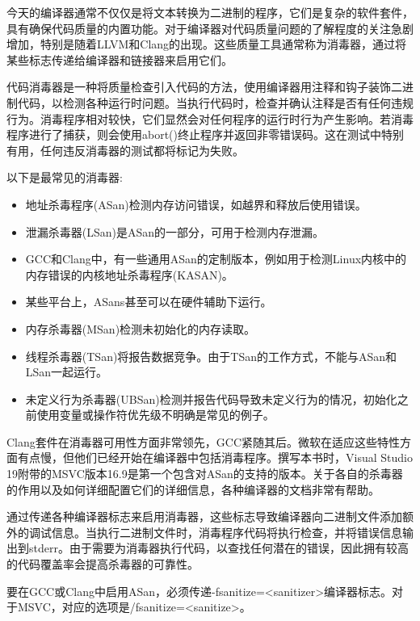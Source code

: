 今天的编译器通常不仅仅是将文本转换为二进制的程序，它们是复杂的软件套件，具有确保代码质量的内置功能。对于编译器对代码质量问题的了解程度的关注急剧增加，特别是随着LLVM和Clang的出现。这些质量工具通常称为消毒器，通过将某些标志传递给编译器和链接器来启用它们。

代码消毒器是一种将质量检查引入代码的方法，使用编译器用注释和钩子装饰二进制代码，以检测各种运行时问题。当执行代码时，检查并确认注释是否有任何违规行为。消毒程序相对较快，它们显然会对任何程序的运行时行为产生影响。若消毒程序进行了捕获，则会使用abort()终止程序并返回非零错误码。这在测试中特别有用，任何违反消毒器的测试都将标记为失败。

以下是最常见的消毒器:

\begin{itemize}
\item 
地址杀毒程序(ASan)检测内存访问错误，如越界和释放后使用错误。

\item 
泄漏杀毒器(LSan)是ASan的一部分，可用于检测内存泄漏。

\item 
GCC和Clang中，有一些通用ASan的定制版本，例如用于检测Linux内核中的内存错误的内核地址杀毒程序(KASAN)。

\item 
某些平台上，ASans甚至可以在硬件辅助下运行。

\item 
内存杀毒器(MSan)检测未初始化的内存读取。

\item 
线程杀毒器(TSan)将报告数据竞争。由于TSan的工作方式，不能与ASan和LSan一起运行。

\item 
未定义行为杀毒器(UBSan)检测并报告代码导致未定义行为的情况，初始化之前使用变量或操作符优先级不明确是常见的例子。
\end{itemize}

Clang套件在消毒器可用性方面非常领先，GCC紧随其后。微软在适应这些特性方面有点慢，但他们已经开始在编译器中包括消毒程序。撰写本书时，Visual Studio 19附带的MSVC版本16.9是第一个包含对ASan的支持的版本。关于各自的杀毒器的作用以及如何详细配置它们的详细信息，各种编译器的文档非常有帮助。

通过传递各种编译器标志来启用消毒器，这些标志导致编译器向二进制文件添加额外的调试信息。当执行二进制文件时，消毒程序代码将执行检查，并将错误信息输出到stderr。由于需要为消毒器执行代码，以查找任何潜在的错误，因此拥有较高的代码覆盖率会提高杀毒器的可靠性。

要在GCC或Clang中启用ASan，必须传递-fsanitize=<sanitizer>编译器标志。对于MSVC，对应的选项是/fsanitize=<sanitize>。

